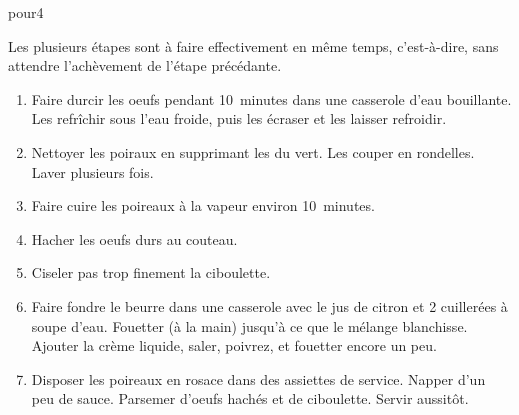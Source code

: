 pour{4}

\begin{ingredients}
\end{ingredients}


\begin{recipe}
  Les plusieurs \'etapes sont \`a faire effectivement en m\^eme temps,
  c'est-\`a-dire, sans attendre l'ach\`evement de l'\'etape
  pr\'ec\'edante.

  \begin{enumerate}

  \item Faire durcir les oeufs pendant 10~minutes dans une casserole
    d'eau bouillante.  Les refr\^ichir sous l'eau froide, puis les
    \'ecraser et les laisser refroidir.

  \item Nettoyer les poiraux en supprimant les \fracTT du vert.  Les
    couper en rondelles.  Laver plusieurs fois.

  \item Faire cuire les poireaux \`a la vapeur environ 10~minutes.

  \item Hacher les oeufs durs au couteau.

  \item Ciseler pas trop finement la ciboulette.

  \item Faire fondre le beurre dans une casserole avec le jus de
    citron et 2 cuiller\'ees \`a soupe d'eau.  Fouetter (\`a la main)
    jusqu'\`a ce que le m\'elange blanchisse.  Ajouter la cr\`eme
    liquide, saler, poivrez, et fouetter encore un peu.

  \item Disposer les poireaux en rosace dans des assiettes de
    service.  Napper d'un peu de sauce.  Parsemer d'oeufs hach\'es et
    de ciboulette.  Servir aussit\^ot.

  \end{enumerate}
\end{recipe}
